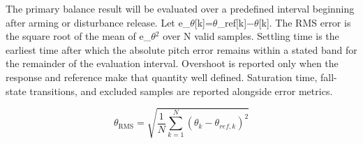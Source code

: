 The primary balance result will be evaluated over a predefined interval
beginning after arming or disturbance release. Let
e\_\ensuremath{\theta}[k]=\ensuremath{\theta}\_ref[k]\ensuremath{-}\ensuremath{\theta}[k]. The RMS error is the square root of
the mean of e\_\ensuremath{\theta}\ensuremath{^{2}} over N valid samples. Settling time is the earliest
time after which the absolute pitch error remains within a stated band
for the remainder of the evaluation interval. Overshoot is reported only
when the response and reference make that quantity well defined.
Saturation time, fall-state transitions, and excluded samples are
reported alongside error metrics.

\begin{equation}
\theta_{\mathrm{RMS}}=\sqrt{\frac{1}{N}\sum_{k=1}^{N}
\left(\theta_k-\theta_{ref,k}\right)^2}
\label{eq:11-1}
\end{equation}

